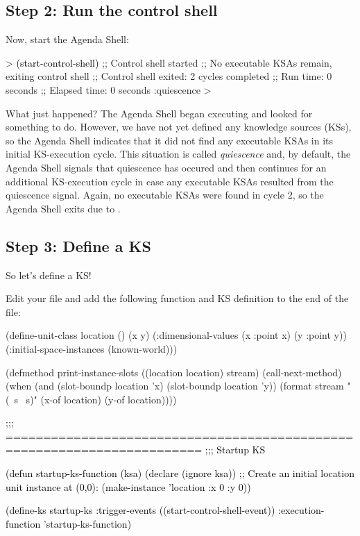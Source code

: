 \documentclass[10pt,twoside,english,pdftex]{article}
\begin{document}
\subsection*{Step 2: Run the control shell}

%
Now, start the Agenda Shell:
%
\begin{example}\color{darkergray}%
  > \textcolor{black}{(start-control-shell)}
  ;; Control shell started
  ;; No executable KSAs remain, exiting control shell
  ;; Control shell exited: 2 cycles completed
  ;; Run time: 0 seconds
  ;; Elapsed time: 0 seconds
  :quiescence
  >
\end{example}

What just happened?  The Agenda Shell began executing and looked for something
to do.  However, we have not yet defined any knowledge sources (KSs), so the
Agenda Shell indicates that it did not find any executable KSAs in its initial
KS-execution cycle.  This situation is called \textit{quiescence} and, by
default, the Agenda Shell signals that quiescence has occured and then
continues for an additional KS-execution cycle in case any executable KSAs
resulted from the quiescence signal.  Again, no executable KSAs were found in
cycle 2, so the Agenda Shell exits due to .

\subsection*{Step 3: Define a KS}

So let's define a KS!

Edit your  file and add the following function
and KS definition to the end of the  file:
%
\begin{example}\color{darkergray}%
  (define-unit-class location ()
    (x y)
    (:dimensional-values
      (x :point x)
      (y :point y))
    (:initial-space-instances (known-world)))

  (defmethod print-instance-slots ((location location) stream)
    (call-next-method)
    (when (and (slot-boundp location 'x)
               (slot-boundp location 'y))
      (format stream " (~s ~s)"
              (x-of location)
              (y-of location))))

  \textcolor{black}{;;; ========================================================================
  ;;;   Startup KS

(defun startup-ks-function (ksa)
    (declare (ignore ksa))
    ;; Create an initial location unit instance at (0,0):
    (make-instance 'location :x 0 :y 0))

  (define-ks startup-ks
      :trigger-events ((start-control-shell-event))
      :execution-function 'startup-ks-function)}
\end{example}
\end{document}

